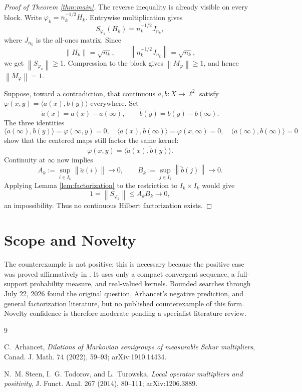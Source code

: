 \documentclass[11pt]{article}
\newcommand{\ellTwo}{\ell^2}
\newcommand{\norm}[1]{\left\lVert #1\right\rVert}
\begin{document}
\begin{proof}[Proof of Theorem \ref{thm:main}]
The reverse inequality is already visible on every block.  Write
$\varphi_k=n_k^{-1/2}H_k$.  Entrywise multiplication gives
\[
                   S_{\varphi_k}(H_k)
                  =n_k^{-1/2}J_{n_k},
\]
where $J_{n_k}$ is the all-ones matrix.  Since
\[
       \norm{H_k}=\sqrt{n_k},
       \qquad
       \norm{n_k^{-1/2}J_{n_k}}=\sqrt{n_k},
\]
we get $\norm{S_{\varphi_k}}\geq1$.  Compression to the block gives
$\norm{M_\varphi}\geq1$, and hence $\norm{M_\varphi}=1$.

Suppose, toward a contradiction, that continuous $a,b:X\to\ellTwo$ satisfy
$\varphi(x,y)=\langle a(x),b(y)\rangle$ everywhere.  Set
\[
        \widetilde a(x)=a(x)-a(\infty),
        \qquad
        \widetilde b(y)=b(y)-b(\infty).
\]
The three identities
\[
 \langle a(\infty),b(y)\rangle=\varphi(\infty,y)=0,
 \quad
 \langle a(x),b(\infty)\rangle=\varphi(x,\infty)=0,
 \quad
 \langle a(\infty),b(\infty)\rangle=0
\]
show that the centered maps still factor the same kernel:
\[
                 \varphi(x,y)
                 =\langle\widetilde a(x),\widetilde b(y)\rangle.
\]
Continuity at $\infty$ now implies
\[
 A_k:=\sup_{i\in I_k}\norm{\widetilde a(i)}\longrightarrow0,
 \qquad
 B_k:=\sup_{j\in I_k}\norm{\widetilde b(j)}\longrightarrow0.
\]
Applying Lemma \ref{lem:factorization} to the restriction to $I_k\times I_k$
would give
\[
                         1=\norm{S_{\varphi_k}}
                         \leq A_kB_k\longrightarrow0,
\]
an impossibility.  Thus no continuous Hilbert factorization exists.
\end{proof}

\section*{Scope and Novelty}

The counterexample is not positive; this is necessary because the positive
case was proved affirmatively in \cite{Arhancet}.  It uses only a compact
convergent sequence, a full-support probability measure, and real-valued
kernels.  Bounded searches through July 22, 2026 found the original question,
Arhancet's negative prediction, and general factorization literature, but no
published counterexample of this form.  Novelty confidence is therefore
moderate pending a specialist literature review.

\begin{thebibliography}{9}

C.~Arhancet,
\emph{Dilations of Markovian semigroups of measurable Schur multipliers},
Canad. J. Math. 74 (2022), 59--93; arXiv:1910.14434.

N.~M. Steen, I.~G. Todorov, and L.~Turowska,
\emph{Local operator multipliers and positivity},
J. Funct. Anal. 267 (2014), 80--111; arXiv:1206.3889.

\end{thebibliography}
\end{document}
